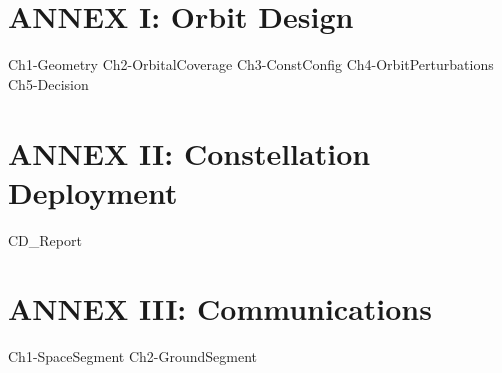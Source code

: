 % 
%





\setlength{\parindent}{0pt}

\usepackage{epigraph}
\usepackage{tocloft}
\usepackage{listings}
\usepackage[framed,numbered,autolinebreaks,useliterate]{mcode}



\newpage\thispagestyle{EmptyPage}
\mbox{}\newpage


\setcounter{tocdepth}{3}
\tableofcontents
\pagebreak

\renewcommand{\cfttabnumwidth}{4em}
\listoftables
\pagebreak

\renewcommand{\cftfignumwidth}{4em}
\listoffigures



\newpage
{}

\newpage
\setlength{\parskip}{1em}



\part{ANNEX I: Orbit Design}
{Ch1-Geometry}
{Ch2-OrbitalCoverage}
{Ch3-ConstConfig}
{Ch4-OrbitPerturbations}
{Ch5-Decision}

\part{ANNEX II: Constellation Deployment}
{CD_Report}

\part{ANNEX III: Communications}
{Ch1-SpaceSegment}
{Ch2-GroundSegment}

